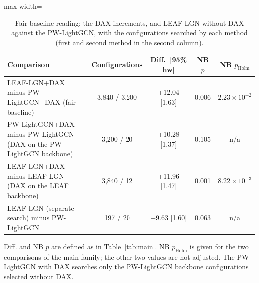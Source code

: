 \begin{table}[tbp]
\centering
\footnotesize
\caption{Fair-baseline reading: the DAX increments, and LEAF-LGN without DAX against the PW-LightGCN, with the configurations searched by each method (first and second method in the second column).}
\label{tab:fair}
\begin{adjustbox}{max width=\linewidth}
\begin{tabular}{lcccc}
\toprule
Comparison & Configurations & Diff.\ [95\% hw] & NB $p$ & NB $p_{\mathrm{Holm}}$ \\
\midrule
LEAF-LGN+DAX minus PW-LightGCN+DAX (fair baseline) & 3,840 / 3,200 & +12.04 [1.63] & 0.006 & $2.23\times10^{-2}$ \\
PW-LightGCN+DAX minus PW-LightGCN (DAX on the PW-LightGCN backbone) & 3,200 / 20 & +10.28 [1.37] & 0.105 & n/a \\
LEAF-LGN+DAX minus LEAF-LGN (DAX on the LEAF backbone) & 3,840 / 12 & +11.96 [1.47] & 0.001 & $8.22\times10^{-3}$ \\
LEAF-LGN (separate search) minus PW-LightGCN & 197 / 20 & +9.63 [1.60] & 0.063 & n/a \\
\bottomrule
\end{tabular}
\end{adjustbox}
\par\smallskip
\begin{minipage}{\linewidth}\raggedright\footnotesize Diff. and NB $p$ are defined as in Table~\ref{tab:main}. NB $p_{\mathrm{Holm}}$ is given for the two comparisons of the main family; the other two values are not adjusted. The PW-LightGCN with DAX searches only the PW-LightGCN backbone configurations selected without DAX.\end{minipage}
\end{table}
